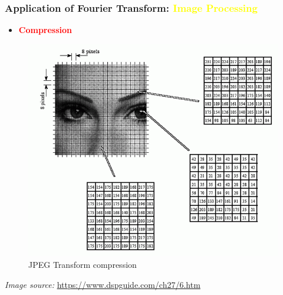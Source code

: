 \documentclass[aspectratio=1610]{beamer}
\begin{document}
  \begin{frame}
     \frametitle{Application of Fourier Transform: \textcolor{yellow}{Image Processing}}
     \begin{itemize}[label=$\star$, itemsep=7pt, parsep=0pt, topsep=10pt]
     \item<1-> \textbf{\textcolor{red}{Compression}}
    \end{itemize} 
    \vspace{-10pt}
    \begin{figure}
        \centering
        \includegraphics[width=0.5\linewidth]{images/imageCmp2.png}
        \caption{JPEG Transform compression}
        \label{fig:enter-label}
    \end{figure}
    \vfill 
    \tiny \textit{Image source:}
    \url{https://www.dspguide.com/ch27/6.htm}
  \end{frame}
  
\end{document}
